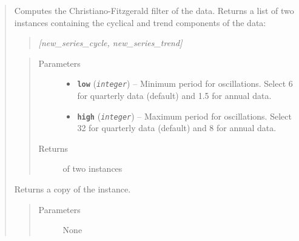 \documentclass[letterpaper,10pt,openany,oneside]{sphinxmanual}
\begin{document}
\begin{fulllineitems}
\begin{quote}
\begin{fulllineitems}
\end{fulllineitems}


\begin{fulllineitems}
\label{series_class:fredpy.series.cffilter}
Computes the Christiano-Fitzgerald filter of the data. Returns a list of two {\hyperref[series_class:fredpy.series]{}} instances containing the cyclical and trend components of the data:
\begin{quote}

\emph{{[}new\_series\_cycle, new\_series\_trend{]}}
\end{quote}
\begin{quote}\begin{description}
\item[{Parameters}] \leavevmode\begin{itemize}
\item {} 
\textbf{\texttt{low}} (\emph{\texttt{integer}}) -- Minimum period for oscillations. Select 6 for quarterly data (default) and 1.5 for annual data.

\item {} 
\textbf{\texttt{high}} (\emph{\texttt{integer}}) -- Maximum period for oscillations. Select 32 for quarterly data (default) and 8 for annual data.

\end{itemize}

\item[{Returns}] \leavevmode
\href{https://docs.python.org/library/functions.html\#list}{} of two {\hyperref[series_class:fredpy.series]{}} instances

\end{description}\end{quote}

\end{fulllineitems}


\begin{fulllineitems}
\label{series_class:fredpy.series.copy}
Returns a copy of the {\hyperref[series_class:fredpy.series]{}} instance.
\begin{quote}\begin{description}
\item[{Parameters}] \leavevmode
None


\end{description}
\end{quote}
\end{fulllineitems}
\end{quote}
\end{fulllineitems}
\end{document}
